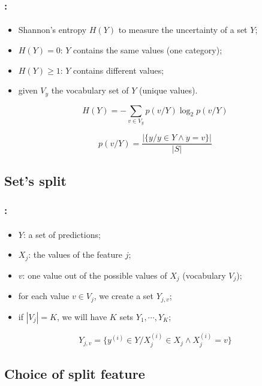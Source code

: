 \documentclass[xcolor=table]{beamer}
\begin{document}
\begin{frame}
	\frametitle{\insertshortsubtitle: \insertsection}
	\framesubtitle{\insertsubsection}
	
	\begin{itemize}
		\item Shannon's entropy $H(Y)$ to measure the uncertainty of a set $Y$;
		\item $H(Y)=0$: $Y$ contains the same values (one category);
		\item $H(Y)\ge 1$: $Y$ contains different values;
		\item given $V_y$ the vocabulary set of $Y$ (unique values).
	\end{itemize}

	\[H(Y) = - \sum\limits_{v \in V_y} p(v/Y) \log_2 p(v/Y)\]
	
	\[p(v/Y) = \frac{|\{y / y \in Y \wedge y = v\}|}{|S|}\]
	
\end{frame}

\subsection{Set's split}

\begin{frame}
	\frametitle{\insertshortsubtitle: \insertsection}
	\framesubtitle{\insertsubsection}
	
	\begin{itemize}
		\item $Y$: a set of predictions;
		\item $X_j$: the values of the feature $j$;
		\item $v$: one value out of the possible values of $X_j$ (vocabulary $V_j$);
		\item for each value $v \in V_j$, we create a set $Y_{j, v}$;
		\item if $|V_j| = K$, we will have $K$ sets $Y_1, \cdots, Y_K$;
	\end{itemize}
	
	\[Y_{j,v} = \{y^{(i)} \in Y / X_j^{(i)} \in X_j \wedge X_j^{(i)} = v\}\]

	
\end{frame}

\subsection{Choice of split feature}
\end{document}
